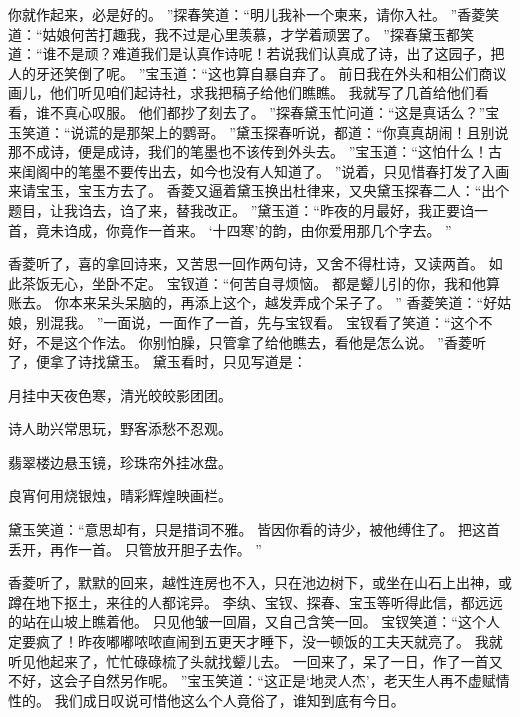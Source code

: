 你就作起来，必是好的。
”探春笑道：“明儿我补一个柬来，请你入社。
”香菱笑道：“姑娘何苦打趣我，我不过是心里羡慕，才学着顽罢了。
”探春黛玉都笑道：“谁不是顽？难道我们是认真作诗呢！若说我们认真成了诗，出了这园子，把人的牙还笑倒了呢。
”宝玉道：“这也算自暴自弃了。
前日我在外头和相公们商议画儿，他们听见咱们起诗社，求我把稿子给他们瞧瞧。
我就写了几首给他们看看，谁不真心叹服。
他们都抄了刻去了。
”探春黛玉忙问道：“这是真话么？”宝玉笑道：“说谎的是那架上的鹦哥。
”黛玉探春听说，都道：“你真真胡闹！且别说那不成诗，便是成诗，我们的笔墨也不该传到外头去。
”宝玉道：“这怕什么！古来闺阁中的笔墨不要传出去，如今也没有人知道了。
”说着，只见惜春打发了入画来请宝玉，宝玉方去了。
香菱又逼着黛玉换出杜律来，又央黛玉探春二人：“出个题目，让我诌去，诌了来，替我改正。
”黛玉道：“昨夜的月最好，我正要诌一首，竟未诌成，你竟作一首来。
‘十四寒’的韵，由你爱用那几个字去。
”\par
香菱听了，喜的拿回诗来，又苦思一回作两句诗，又舍不得杜诗，又读两首。
如此茶饭无心，坐卧不定。
宝钗道：“何苦自寻烦恼。
都是颦儿引的你，我和他算账去。
你本来呆头呆脑的，再添上这个，越发弄成个呆子了。
”
香菱笑道：“好姑娘，别混我。
”一面说，一面作了一首，先与宝钗看。
宝钗看了笑道：“这个不好，不是这个作法。
你别怕臊，只管拿了给他瞧去，看他是怎么说。
”香菱听了，便拿了诗找黛玉。
黛玉看时，只见写道是：\par
\hop
月挂中天夜色寒，清光皎皎影团团。
\par
诗人助兴常思玩，野客添愁不忍观。
\par
翡翠楼边悬玉镜，珍珠帘外挂冰盘。
\par
良宵何用烧银烛，晴彩辉煌映画栏。
\par
\hop
黛玉笑道：“意思却有，只是措词不雅。
皆因你看的诗少，被他缚住了。
把这首丢开，再作一首。
只管放开胆子去作。
”\par
香菱听了，默默的回来，越性连房也不入，只在池边树下，或坐在山石上出神，或蹲在地下抠土，来往的人都诧异。
李纨、宝钗、探春、宝玉等听得此信，都远远的站在山坡上瞧着他。
只见他皱一回眉，又自己含笑一回。
宝钗笑道：“这个人定要疯了！昨夜嘟嘟哝哝直闹到五更天才睡下，没一顿饭的工夫天就亮了。
我就听见他起来了，忙忙碌碌梳了头就找颦儿去。
一回来了，呆了一日，作了一首又不好，这会子自然另作呢。
”宝玉笑道：“这正是‘地灵人杰’，老天生人再不虚赋情性的。
我们成日叹说可惜他这么个人竟俗了，谁知到底有今日。
